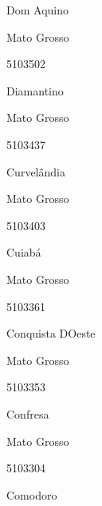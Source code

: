 \documentclass[
  letterpaper,
]{report}
\begin{document}
Dom Aquino

\n    

\n    

\n      

Mato Grosso

\n      

5103502

\n      

Diamantino

\n    

\n    

\n      

Mato Grosso

\n      

5103437

\n      

Curvelândia

\n    

\n    

\n      

Mato Grosso

\n      

5103403

\n      

Cuiabá

\n    

\n    

\n      

Mato Grosso

\n      

5103361

\n      

Conquista D\textquotesingle Oeste

\n    

\n    

\n      

Mato Grosso

\n      

5103353

\n      

Confresa

\n    

\n    

\n      

Mato Grosso

\n      

5103304

\n      

Comodoro

\n    

\n    

\n      
\end{document}
